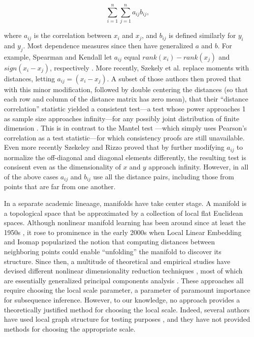 \documentclass[11pt]{article}
\begin{document}
$$\sum_{i=1}^n \sum_{j=1}^n a_{ij} b_{ij}, $$

where $a_{ij}$ is the correlation between $x_i$ and $x_j$, and $b_{ij}$ is defined similarly for $y_i$ and $y_j$.  Most dependence measures since then have generalized $a$ and $b$.  For example, Spearman and Kendall let $a_{ij}$ equal $rank(x_i)-rank(x_j)$ and $sign(x_i-x_j)$, respectively \cite{KendallBook}.  More recently, Szekely et al. \cite{SzekelyRizzoBakirov2007} replace moments with distances, letting  $a_{ij}=(x_i-x_j)$.  A subset of those authors then proved that with this minor modification, followed by double centering the distances (so that each row and column of the distance matrix has zero mean), that their ``distance correlation'' statistic yielded a consistent test---a test whose power approaches 1 as sample size approaches infinity---for any possibly joint distribution of finite dimension \cite{SzekelyRizzo2009}. This is in contrast to the Mantel test \cite{Mantel1967}---which simply uses Pearson's correlation as a test statistic---for which consistency proofs are still unavailable.
 Even more recently Szekeley and Rizzo proved that by further modifying $a_{ij}$ to normalize the off-diagonal and diagonal elements differently, the resulting test is consisent even as the dimensionality of $x$ and $y$ approach infinity.  However, in all of the above cases $a_{ij}$ and $b_{ij}$ use all the distance pairs, including those from points that are far from one another.

 In a separate academic lineaage, manifolds have take center stage.  A manifold is a topological space that be approximated by a collection of local flat Euclidean spaces.  Although nonlinear manifold learning has been around since at least the 1950s \cite{TorgersonBook}, it rose to prominence in the early 2000s when Local Linear Embedding \cite{Roweis200} and Isomap \cite{Tenenbaum2000} popularized the notion that computing distances between neighboring points could enable ``unfolding'' the manifold to discover its structure.  Since then, a multitude of theoretical and empirical studies have devised different nonlinear dimensionality reduction techniques \cite{LeeVerleysen2007}, most of which are essentially generalized principal components analysis \cite{ScholkopfSmolaMuller1999}.  These approaches all require choosing the local scale parameter, a parameter of paramount importance for subsequence inference.  However, to our knowledge, no approach provides a theoretically justified method for choosing the local scale. Indeed,  several authors have used local graph structure for testing purposes \cite{David1966,Friedman1983,Schilling1986,Dumcke2014}, and they have not provided methods for choosing the appropriate scale.
\end{document}
